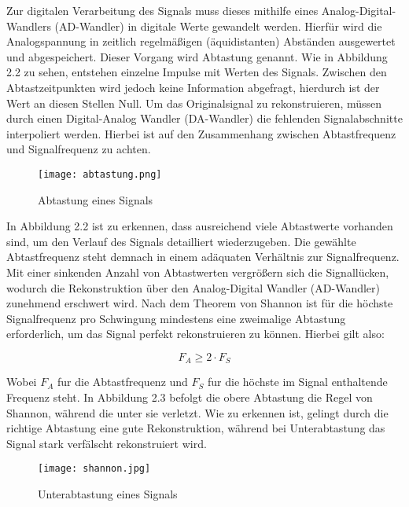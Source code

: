 Zur digitalen Verarbeitung des Signals muss dieses mithilfe eines Analog-Digital-Wandlers
(AD-Wandler) in digitale Werte gewandelt werden. Hierfür wird die Analogspannung in zeitlich regelmäßigen (äquidistanten) Abständen ausgewertet und abgespeichert. Dieser
Vorgang wird Abtastung genannt. Wie in Abbildung 2.2 zu sehen, entstehen einzelne
Impulse mit Werten des Signals. Zwischen den Abtastzeitpunkten wird jedoch keine Information abgefragt, hierdurch ist der Wert an diesen Stellen Null. Um das Originalsignal zu
rekonstruieren, müssen durch einen Digital-Analog Wandler (DA-Wandler) die fehlenden Signalabschnitte interpoliert werden. Hierbei ist auf den Zusammenhang zwischen Abtastfrequenz und Signalfrequenz zu achten.


\begin{figure}[H]
	\centering
	\texttt{[image: abtastung.png]}
	\caption[Abtastung eines Signals]{Abtastung eines Signals} \cite{michelsSonographieOrganUnd2012}
	\label{fig:abtastung}
\end{figure}

In Abbildung 2.2 ist zu erkennen, dass ausreichend viele Abtastwerte vorhanden sind,
um den Verlauf des Signals detailliert wiederzugeben. Die gewählte Abtastfrequenz steht
demnach in einem adäquaten Verhältnis zur Signalfrequenz. Mit einer sinkenden Anzahl
von Abtastwerten vergrößern sich die Signallücken, wodurch die Rekonstruktion über den Analog-Digital Wandler (AD-Wandler) zunehmend erschwert wird. Nach dem Theorem von Shannon ist für die höchste Signalfrequenz pro Schwingung mindestens eine zweimalige Abtastung erforderlich, um das Signal perfekt rekonstruieren zu können. Hierbei gilt also:

\begin{equation}
	\label{equ:bsp1}
	F_{A} \geq 2 \cdot F_{S}
\end{equation}

Wobei $F_{A}$ fur die Abtastfrequenz und $F_{S}$ fur die höchste im Signal enthaltende Frequenz
steht. In Abbildung 2.3 befolgt die obere Abtastung die Regel von Shannon, während die unter sie verletzt. Wie zu erkennen ist, gelingt durch die richtige Abtastung eine gute Rekonstruktion, während bei Unterabtastung das Signal stark verfälscht rekonstruiert wird.

\begin{figure}[H]
	\centering
	\texttt{[image: shannon.jpg]}
	\caption[Unterabtastung eines Signals]{Unterabtastung eines Signals} \cite{stotzComputergestuetzteAudioUnd2019}
	\label{fig:shannon}
\end{figure}

